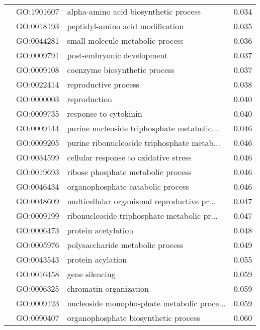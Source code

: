 \begin{longtable}{lllr}
   & GO:1901607 &        alpha-amino acid biosynthetic process &         0.034 \\
   & GO:0018193 &             peptidyl-amino acid modification &         0.035 \\
   & GO:0044281 &             small molecule metabolic process &         0.036 \\
   & GO:0009791 &                   post-embryonic development &         0.037 \\
   & GO:0009108 &                coenzyme biosynthetic process &         0.037 \\
   & GO:0022414 &                         reproductive process &         0.038 \\
   & GO:0000003 &                                 reproduction &         0.040 \\
   & GO:0009735 &                        response to cytokinin &         0.040 \\
   & GO:0009144 &  purine nucleoside triphosphate metabolic... &         0.046 \\
   & GO:0009205 &  purine ribonucleoside triphosphate metab... &         0.046 \\
   & GO:0034599 &        cellular response to oxidative stress &         0.046 \\
   & GO:0019693 &           ribose phosphate metabolic process &         0.046 \\
   & GO:0046434 &            organophosphate catabolic process &         0.046 \\
   & GO:0048609 &  multicellular organismal reproductive pr... &         0.047 \\
   & GO:0009199 &  ribonucleoside triphosphate metabolic pr... &         0.047 \\
   & GO:0006473 &                          protein acetylation &         0.048 \\
   & GO:0005976 &             polysaccharide metabolic process &         0.049 \\
   & GO:0043543 &                            protein acylation &         0.055 \\
   & GO:0016458 &                               gene silencing &         0.059 \\
   & GO:0006325 &                       chromatin organization &         0.059 \\
   & GO:0009123 &  nucleoside monophosphate metabolic proce... &         0.059 \\
   & GO:0090407 &         organophosphate biosynthetic process &         0.060 \\

\end{longtable}
